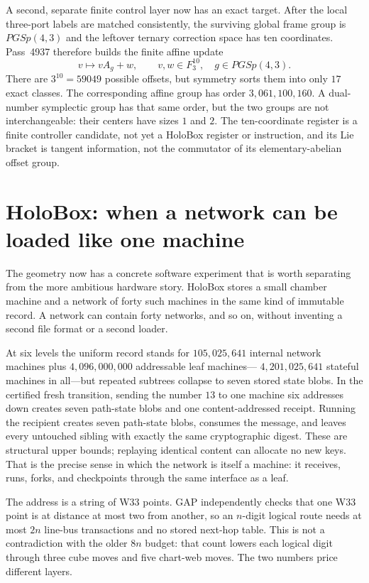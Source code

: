 \documentclass[11pt]{article}
\def\mathbb#1{#1}%
\begin{document}
A second, separate finite control layer now has an exact target.  After the
local three-port labels are matched consistently, the surviving global frame
group is $PGSp(4,3)$ and the leftover ternary correction space has ten
coordinates.  Pass~4937 therefore builds the finite affine update
\[
 v\longmapsto vA_g+w,\qquad v,w\in\mathbb F_3^{10},\quad
 g\in PGSp(4,3).
\]
There are $3^{10}=59049$ possible offsets, but symmetry sorts them into only
$17$ exact classes.  The corresponding affine group has order
$3{,}061{,}100{,}160$.  A dual-number symplectic group has that same order,
but the two groups are not interchangeable: their centers have sizes $1$ and
$2$.  The ten-coordinate register is a finite controller candidate, not yet a
HoloBox register or instruction, and its Lie bracket is tangent information,
not the commutator of its elementary-abelian offset group.

\section{HoloBox: when a network can be loaded like one machine}

The geometry now has a concrete software experiment that is worth separating
from the more ambitious hardware story. HoloBox stores a small chamber machine
and a network of forty such machines in the same kind of immutable record. A
network can contain forty networks, and so on, without inventing a second file
format or a second loader.

At six levels the uniform record stands for $105{,}025{,}641$ internal network
machines plus $4{,}096{,}000{,}000$ addressable leaf machines---
$4{,}201{,}025{,}641$ stateful machines in all---but repeated subtrees collapse to
seven stored state blobs. In the certified fresh transition, sending the number
$13$ to one machine six addresses down creates seven path-state blobs and one
content-addressed receipt. Running the recipient creates seven path-state blobs,
consumes the message, and leaves every untouched sibling with exactly the same
cryptographic digest. These are structural upper bounds; replaying identical
content can allocate no new keys. That is the precise sense in which the network is
itself a machine: it receives, runs, forks, and checkpoints through the same
interface as a leaf.

The address is a string of W33 points. GAP independently checks that one W33
point is at distance at most two from another, so an $n$-digit logical route
needs at most $2n$ line-bus transactions and no stored next-hop table. This is
not a contradiction with the older $8n$ budget: that count lowers each logical
digit through three cube moves and five chart-web moves. The two numbers price
different layers.
\end{document}

